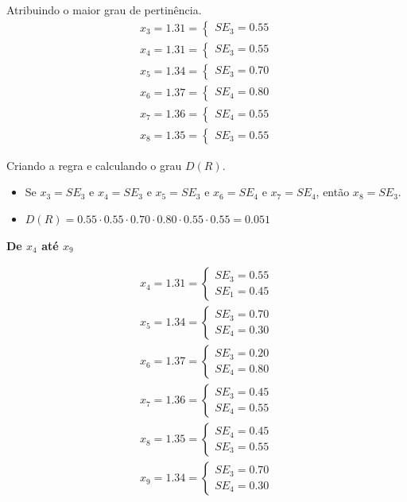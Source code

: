\documentclass[12pt]{article}
\begin{document}
Atribuindo o maior grau de pertinência.
\begin{align*}
	x_3=1.31=\begin{cases}
		SE_3=0.55
	\end{cases}\\
	x_4=1.31=\begin{cases}
		SE_3=0.55
	\end{cases}\\
	x_5=1.34=\begin{cases}
		SE_3=0.70
	\end{cases}\\
	x_6=1.37=\begin{cases}
		SE_4=0.80
	\end{cases}\\
	x_7=1.36=\begin{cases}
		SE_4=0.55
	\end{cases}\\
	x_8=1.35=\begin{cases}
		SE_3=0.55
	\end{cases}
\end{align*}

Criando a regra e calculando o grau $D(R)$.
\begin{itemize}
	\item Se $x_3=SE_3$ e $x_4=SE_3$ e $x_5=SE_3$ e $x_6=SE_4$ e $x_7=SE_4$, então $x_8=SE_3$.
	\item $D(R)=0.55\cdot0.55\cdot0.70\cdot0.80\cdot0.55\cdot0.55=0.051$
\end{itemize}

\textbf{De $x_4$ até $x_9$}

\begin{align*}
	x_4=1.31=\begin{cases}
		SE_3=0.55\\SE_1=0.45
	\end{cases}\\
	x_5=1.34=\begin{cases}
		SE_3=0.70\\SE_4=0.30
	\end{cases}\\
	x_6=1.37=\begin{cases}
		SE_3=0.20\\SE_4=0.80
	\end{cases}\\
	x_7=1.36=\begin{cases}
		SE_3=0.45\\SE_4=0.55
	\end{cases}\\
	x_8=1.35=\begin{cases}
		SE_4=0.45\\SE_3=0.55
	\end{cases}\\
	x_9=1.34=\begin{cases}
		SE_3=0.70\\SE_4=0.30
	\end{cases}
\end{align*}
\end{document}
